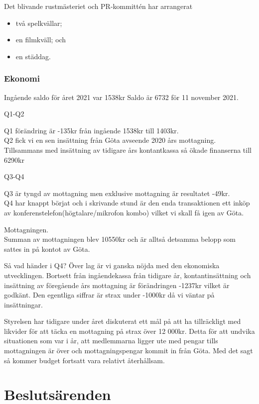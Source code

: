 \documentclass[protokoll]{dvd}
\begin{document}
Det blivande rustmästeriet och PR-kommittén har arrangerat

\begin{itemize}
    \item två spelkvällar;
    \item en filmkväll; och
    \item en städdag.
\end{itemize}

\newpage

\subsubsection{Ekonomi}

Ingående saldo för året 2021 var 1538kr
Saldo är 6732 för 11 november 2021.

Q1-Q2

Q1 förändring är -135kr från ingående 1538kr till 1403kr.\\
Q2 fick vi en sen insättning från Göta avseende 2020 års mottagning.  Tillsammans med insättning av tidigare års kontantkassa så ökade finanserna till 6290kr

Q3-Q4

Q3 är tyngd av mottagning men exklusive mottagning är resultatet -49kr.\\
Q4 har knappt börjat och i skrivande stund är den enda transaktionen ett inköp av konferenstelefon(högtalare/mikrofon kombo) vilket vi skall få igen av Göta.

Mottagningen.\\
Summan av mottagningen blev 10550kr och är alltså detsamma belopp som sattes in på kontot av Göta.

Så vad händer i Q4? Över lag är vi ganska nöjda med den ekonomiska utvecklingen. Bortsett från ingåendekassa från tidigare år, kontantinsättning och insättning av föregående års mottagning är förändringen -1237kr vilket är godkänt. Den egentliga siffrar är strax under -1000kr då vi väntar på insättningar.

Styrelsen har tidigare under året diskuterat ett mål på att ha tillräckligt med likvider för att täcka en mottagning på strax över 12 000kr. Detta för att undvika situationen som var i år, att medlemmarna ligger ute med pengar tills mottagningen är över och mottagningspengar kommit in från Göta. Med det sagt så kommer budget fortsatt vara relativt återhållsam.


\newpage
\section{Beslutsärenden}
\end{document}
